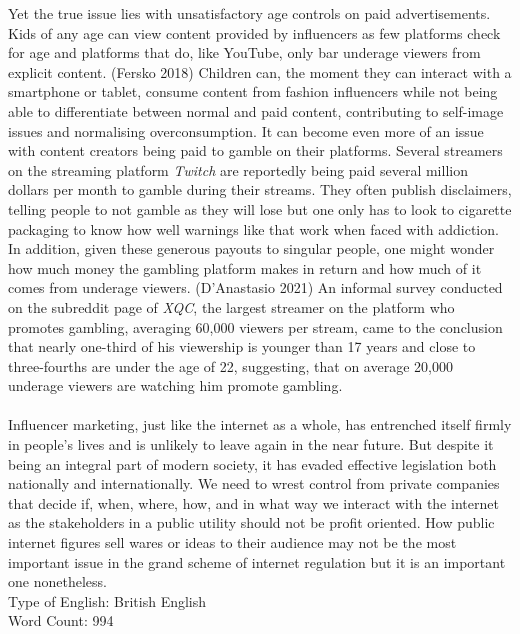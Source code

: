 \documentclass{article}
\begin{document}
	Yet the true issue lies with unsatisfactory age controls on paid advertisements. Kids of any age can view content provided by influencers as few platforms check for age and platforms that do, like YouTube, only bar underage viewers from explicit content. (Fersko 2018) Children can, the moment they can interact with a smartphone or tablet, consume content from fashion influencers while not being able to differentiate between normal and paid content, contributing to self-image issues and normalising overconsumption. It can become even more of an issue with content creators being paid to gamble on their platforms. Several streamers on the streaming platform \textit{Twitch} are reportedly being paid several million dollars per month to gamble during their streams. They often publish disclaimers, telling people to not gamble as they will lose but one only has to look to cigarette packaging to know how well warnings like that work when faced with addiction. In addition, given these generous payouts to singular people, one might wonder how much money the gambling platform makes in return and how much of it comes from underage viewers. (D'Anastasio 2021) An informal survey conducted on the subreddit page of \textit{XQC}, the largest streamer on the platform who promotes gambling, averaging 60,000 viewers per stream, came to the conclusion that nearly one-third of his viewership is younger than 17 years and close to three-fourths are under the age of 22, suggesting, that on average 20,000 underage viewers are watching him promote gambling. \\ \\

	Influencer marketing, just like the internet as a whole, has entrenched itself firmly in people's lives and is unlikely to leave again in the near future. But despite it being an integral part of modern society, it has evaded effective legislation both nationally and internationally. We need to wrest control from private companies that decide if, when, where, how, and in what way we interact with the internet as the stakeholders in a public utility should not be profit oriented. How public internet figures sell wares or ideas to their audience may not be the most important issue in the grand scheme of internet regulation but it is an important one nonetheless. \\
	
	Type of English: British English \\
	Word Count: 994
	\newpage
	\endgroup
\end{document}
